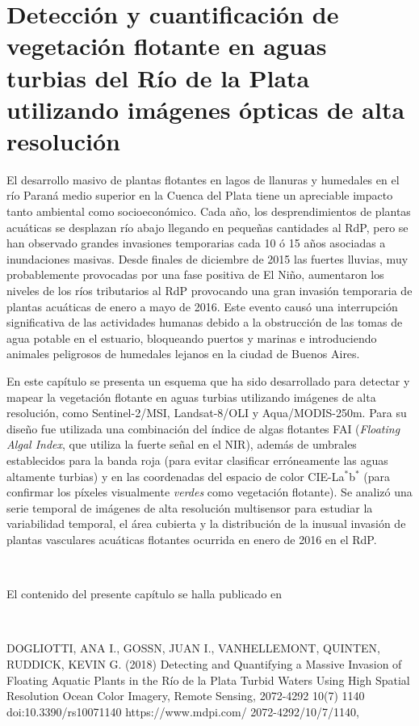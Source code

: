 \chapter[Detección de vegetación flotante en el RdP]{Detección y cuantificación de vegetación flotante en aguas turbias del Río de la Plata utilizando imágenes ópticas de alta resolución}
\label{cam} 

El desarrollo masivo de plantas flotantes en lagos de llanuras y humedales en el río Paraná medio superior en la Cuenca del Plata tiene un apreciable impacto tanto ambiental como socioeconómico. Cada año, los desprendimientos de plantas acuáticas se desplazan río abajo llegando en pequeñas cantidades al RdP, pero se han observado grandes invasiones temporarias cada 10 ó 15 años asociadas a inundaciones masivas. Desde finales de diciembre de 2015 las fuertes lluvias, muy probablemente provocadas por una fase positiva de El Niño, aumentaron los niveles de los ríos tributarios al RdP provocando una gran invasión temporaria de plantas acuáticas de enero a mayo de 2016. Este evento causó una interrupción significativa de las actividades humanas debido a la obstrucción de las tomas de agua potable en el estuario, bloqueando puertos y marinas e introduciendo animales peligrosos de humedales lejanos en la ciudad de Buenos Aires.

En este capítulo se presenta un esquema que ha sido desarrollado para detectar y mapear la vegetación flotante en aguas turbias utilizando imágenes de alta resolución, como Sentinel-2/MSI, Landsat-8/OLI y Aqua/MODIS-250m. Para su diseño fue utilizada una combinación del índice de algas flotantes FAI (\textit{Floating Algal Index}, que utiliza la fuerte señal en el NIR), además de umbrales establecidos para la banda roja (para evitar clasificar erróneamente las aguas altamente turbias) y en las coordenadas del espacio de color CIE-La$^{*}$b$^{*}$ (para confirmar los píxeles visualmente \textit{verdes} como vegetación flotante). Se analizó una serie temporal de imágenes de alta resolución multisensor para estudiar la variabilidad temporal, el área cubierta y la distribución de la inusual invasión de plantas vasculares acuáticas flotantes ocurrida en enero de 2016 en el RdP.

$\quad$

\noindent
El contenido del presente capítulo se halla publicado en

$\quad$

\noindent
DOGLIOTTI, ANA I., GOSSN, JUAN I., VANHELLEMONT, QUINTEN, RUDDICK, KEVIN G. (2018) Detecting and Quantifying a Massive Invasion of Floating Aquatic Plants in the Río de la Plata Turbid Waters Using High Spatial Resolution Ocean Color Imagery, Remote Sensing, 2072-4292 10(7) 1140 doi:10.3390/rs10071140 https://www.mdpi.com/ 2072-4292/10/7/1140, \cite{dogliotti2018}

